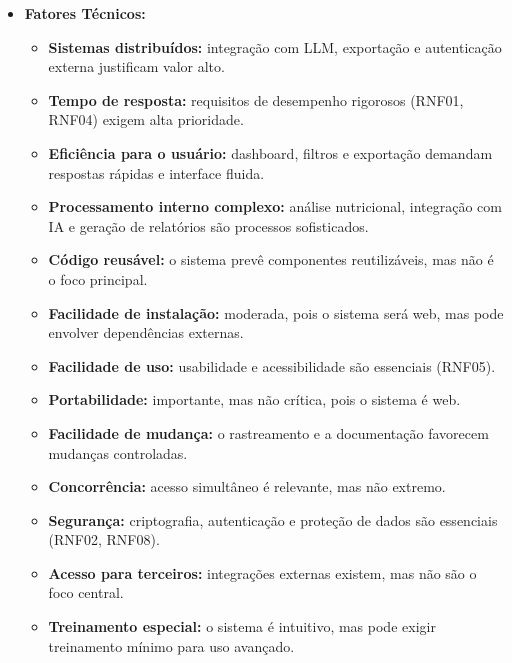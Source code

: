 \begin{itemize}
\item \textbf{Fatores Técnicos:}
\begin{itemize}
    \item \textbf{Sistemas distribuídos:} integração com LLM, exportação e autenticação externa justificam valor alto.
    \item \textbf{Tempo de resposta:} requisitos de desempenho rigorosos (RNF01, RNF04) exigem alta prioridade.
    \item \textbf{Eficiência para o usuário:} dashboard, filtros e exportação demandam respostas rápidas e interface fluida.
    \item \textbf{Processamento interno complexo:} análise nutricional, integração com IA e geração de relatórios são processos sofisticados.
    \item \textbf{Código reusável:} o sistema prevê componentes reutilizáveis, mas não é o foco principal.
    \item \textbf{Facilidade de instalação:} moderada, pois o sistema será web, mas pode envolver dependências externas.
    \item \textbf{Facilidade de uso:} usabilidade e acessibilidade são essenciais (RNF05).
    \item \textbf{Portabilidade:} importante, mas não crítica, pois o sistema é web.
    \item \textbf{Facilidade de mudança:} o rastreamento e a documentação favorecem mudanças controladas.
    \item \textbf{Concorrência:} acesso simultâneo é relevante, mas não extremo.
    \item \textbf{Segurança:} criptografia, autenticação e proteção de dados são essenciais (RNF02, RNF08).
    \item \textbf{Acesso para terceiros:} integrações externas existem, mas não são o foco central.
    \item \textbf{Treinamento especial:} o sistema é intuitivo, mas pode exigir treinamento mínimo para uso avançado.
\end{itemize}
\end{itemize}

